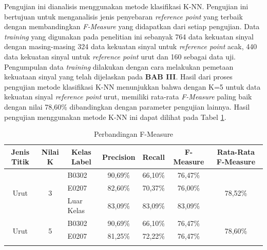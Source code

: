 \begin{enumerate}[a.]
\begin{enumerate}
	      \par Pengujian ini dianalisis menggunakan metode klasifikasi K-NN. Pengujian ini bertujuan untuk menganalisis jenis penyebaran \textit{reference point} yang terbaik dengan membandingkan \textit{F-Measure} yang didapatkan dari setiap pengujian. Data \textit{training} yang digunakan pada penelitian ini sebanyak 764 data kekuatan sinyal dengan masing-masing 324 data kekuatan sinyal untuk \textit{reference point} acak, 440 data kekuatan sinyal untuk \textit{reference point} urut dan 160 sebagai data uji. Pengumpulan data \textit{training} dilakukan dengan cara melakukan pemetaan kekuataan sinyal yang telah dijelaskan pada \textbf{BAB III}. Hasil dari proses pengujian metode klasifikasi K-NN menunjukkan bahwa dengan K=5 untuk data kekuatan sinyal \textit{reference point} urut, memiliki rata-rata \textit{F-Measure} paling baik dengan nilai 78,60\% dibandingkan dengan parameter pengujian lainnya. Hasil pengujian menggunakan metode K-NN ini  dapat dilihat pada Tabel \ref{tabelfmeasure9}.
	      \begin{table}[H]
		      \fontsize{9}{12}\selectfont
		      \center
		      \caption{Perbandingan F-Measure}
		      \label{tabelfmeasure9}
		      \begin{tabular}{|c|c|l|c|c|c|c|}
			      \hline
			      Jenis Titik           & Nilai K            & \multicolumn{1}{c|}{Kelas Label} & Precision & Recall  & F-Measure & Rata-Rata F-Measure      \\ \hline
			      \multirow{3}{*}{Urut} & \multirow{3}{*}{3} & B0302                            & 90,69\%   & 66,10\% & 76,47\%   & \multirow{3}{*}{78,52\%} \\ \cline{3-6}
			                            &                    & E0207                            & 82,60\%   & 70,37\% & 76,00\%   &                          \\ \cline{3-6}
			                            &                    & Luar Kelas                       & 83,09\%   & 83,09\% & 83,09\%   &                          \\ \hline
			      \multirow{3}{*}{Urut} & \multirow{3}{*}{5} & B0302                            & 90,69\%   & 66,10\% & 76,47\%   & \multirow{3}{*}{78,60\%} \\ \cline{3-6}
			                            &                    & E0207                            & 81,25\%   & 72,22\% & 76,47\%   &                          \\ \cline{3-6}

\end{tabular}
\end{table}
\end{enumerate}
\end{enumerate}
